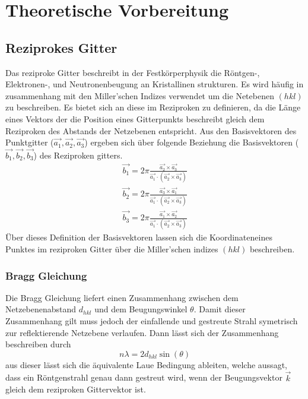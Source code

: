 \section{Theoretische Vorbereitung}
    \subsection{Reziprokes Gitter}
        Das reziproke Gitter beschreibt in der Festkörperphysik die Röntgen-, Elektronen-, und Neutronenbeugung
        an Kristallinen strukturen. Es wird häufig in zusammenhang mit den Miller'schen Indizes verwendet
        um die Netebenen $(hkl)$ zu beschreiben. Es bietet sich an diese im Reziproken zu definieren, da die Länge
        eines Vektors der die Position eines Gitterpunkts beschreibt gleich dem Reziproken des Abstands der
        Netzebenen entspricht.
        Aus den Basisvektoren des Punktgitter ($\vec{a_1},\vec{a_2},\vec{a_3}$) ergeben sich über folgende Beziehung
        die Basisvektoren ($\vec{b_1},\vec{b_2},\vec{b_3}$) des Reziproken gitters.
        \begin{align*}
            \vec{b_1} = 2\pi \frac{\vec{a_2}\times \vec{a_3}}{\vec{a_1}\cdot (\vec{a_2}\times \vec{a_3})}
            \\\vec{b_2} = 2\pi \frac{\vec{a_3}\times \vec{a_1}}{\vec{a_1}\cdot (\vec{a_2}\times \vec{a_3})}
            \\\vec{b_3} = 2\pi \frac{\vec{a_1}\times \vec{a_2}}{\vec{a_1}\cdot (\vec{a_2}\times \vec{a_3})}
        \end{align*}
        Über dieses Definition der Basisvektoren lassen sich die Koordinateneines Punktes im reziproken Gitter
        über die Miller'schen indizes $(hkl)$ beschreiben.
        
        \subsubsection*{Bragg Gleichung}
            Die Bragg Gleichung liefert einen Zusammenhang zwischen dem Netzebenenabstand $d_{hkl}$ und dem
            Beugungswinkel $\theta$. Damit dieser Zusammenhang gilt muss jedoch der einfallende und gestreute
            Strahl symetrisch zur reflektierende Netzebene verlaufen. Dann lässt sich der Zusammenhang beschreiben durch
            \begin{equation}
                n\lambda = 2d_{hkl} \sin(\theta)
            \end{equation}
            aus dieser lässt sich die äquivalente Laue Bedingung ableiten, welche aussagt,
            dass ein Röntgenstrahl genau dann gestreut wird, wenn der Beugungsvektor $\vec{k}$ gleich dem
            reziproken Gittervektor ist. 
    
